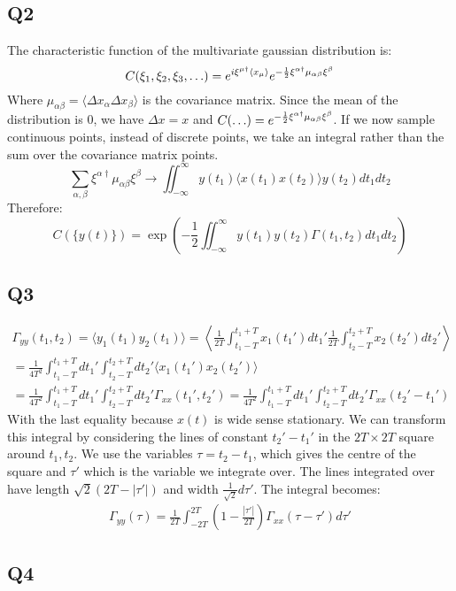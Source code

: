 \documentclass[../main.tex]{subfiles}
\begin{document}
\subsection{Q2}
The characteristic function of the multivariate gaussian distribution is:
\begin{equation}
	C(\xi_1, \xi_2, \xi_3, \mathellipsis) = e^{i\mathbf{\xi^{\mu\dag}}\langle x_\mu\rangle}e^{-\frac{1}{2}\xi^{\alpha\dag}\mu_{\alpha\beta}\xi^{\beta}}
\end{equation}
Where $\mu_{\alpha\beta}=\langle \Delta x_\alpha\Delta x_\beta \rangle$ is the covariance matrix. Since the mean of the distribution is $0$, we have $\Delta x = x$ and $C(\mathellipsis)=e^{-\frac{1}{2}\xi^{\alpha\dag}\mu_{\alpha\beta}\xi^{\beta}}$. If we now sample continuous points, instead of discrete points, we take an integral rather than the sum over the covariance matrix points.
\begin{equation}
	\sum_{\alpha,\beta}\xi^{\alpha \dag}\mu_{\alpha\beta}\xi^{\beta} \rightarrow \iint_{-\infty}^{\infty} y(t_1)\langle x(t_1)x(t_2)\rangle y(t_2) dt_1 dt_2
\end{equation}
Therefore:
\begin{equation}
	C(\{y(t)\}) = \exp{\left(-\frac{1}{2}\iint_{-\infty}^{\infty}y(t_1)y(t_2)\Gamma(t_1, t_2)dt_1dt_2\right)}
\end{equation}
\subsection{Q3}
\begin{eqnarray}
	\Gamma_{yy}(t_1, t_2) = \langle y_1(t_1)y_2(t_1)\rangle =
	\left\langle \frac{1}{2T}\int_{t_1-T}^{t_1+T} x_1(t_1')dt_1' \frac{1}{2T}\int_{t_2-T}^{t_2+T} x_2(t_2')dt_2'\right\rangle \\
	= \frac{1}{4T^2} \int_{t_1-T}^{t_1+T}dt_1'\int_{t_2-T}^{t_2+T}dt_2'\langle x_1(t_1')x_2(t_2')\rangle \\
	= \frac{1}{4T^2} \int_{t_1-T}^{t_1+T}dt_1'\int_{t_2-T}^{t_2+T}dt_2' \Gamma_{xx}(t_1', t_2')
= \frac{1}{4T^2} \int_{t_1-T}^{t_1+T}dt_1'\int_{t_2-T}^{t_2+T}dt_2' \Gamma_{xx}(t_2'-t_1')
\end{eqnarray}
With the last equality because $x(t)$ is wide sense stationary. We can transform this integral by considering the lines of constant $t_2'-t_1'$ in the $2T\times2T$ square around $t_1, t_2$. We use the variables $\tau=t_2-t_1$, which gives the centre of the square and $\tau'$ which is the variable we integrate over. The lines integrated over have length $\sqrt2\left(2T-\left| \tau'\right|\right)$ and width $\frac{1}{\sqrt2}d\tau'$. The integral becomes:
\begin{eqnarray}
	\Gamma_{yy}(\tau) = \frac{1}{2T}\int_{-2T}^{2T}\left( 1-\frac{\left|\tau'\right|}{2T}\right)\Gamma_{xx}(\tau-\tau')d\tau'
\end{eqnarray}

\subsection{Q4}
\end{document}
